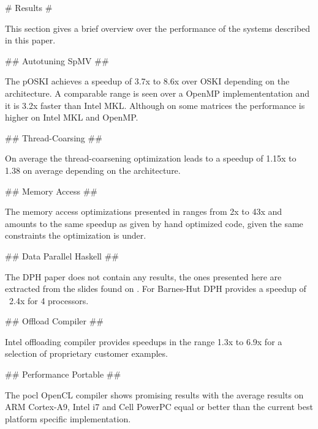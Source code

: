 \begin{markdown}


# Results #
\label{sec:results}
  
This section gives a brief overview over the performance of the
systems described in this paper. 

## Autotuning SpMV ##

The pOSKI \cite{auto} achieves a speedup of 3.7x to 8.6x over OSKI
depending on the architecture. A comparable range is seen over a
OpenMP implemententation and it is 3.2x faster than Intel
MKL\cite{mkl}. Although on some matrices the performance is higher on
Intel MKL and OpenMP.

## Thread-Coarsing ##

On average the thread-coarsening optimization leads to a speedup of
1.15x to 1.38 on average depending on the architecture.

## Memory Access ##

The memory access optimizations presented in \cite{mem-acc} ranges
from 2x to 43x and amounts to the same speedup as given by hand
optimized code, given the same constraints the optimization is under.

## Data Parallel Haskell ##

The DPH paper does not contain any results, the ones presented here
are extracted from the slides found on \cite{dph-slides}. For
Barnes-Hut DPH provides a speedup of ~2.4x for 4 processors. 

## Offload Compiler ##

Intel offloading compiler provides speedups in the range 1.3x to 6.9x
for a selection of proprietary customer examples.

## Performance Portable ##

The pocl OpenCL compiler shows promising results with the average
results on ARM Cortex-A9, Intel i7 and Cell PowerPC equal or better
than the current best platform specific implementation.


\end{markdown}

